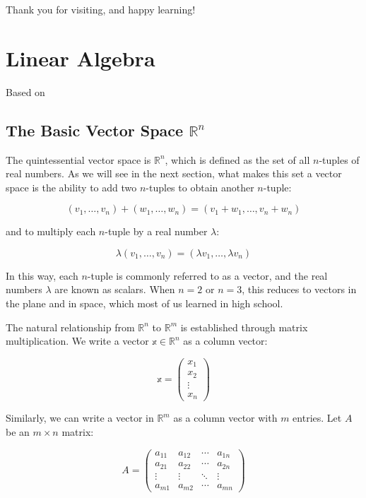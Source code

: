 \documentclass[
]{book}
\theoremstyle{definition}
\theoremstyle{definition}
\theoremstyle{definition}
\theoremstyle{definition}
\theoremstyle{remark}
\begin{document}
Thank you for visiting, and happy learning!

\hypertarget{linear-algebra}{%
\chapter{Linear Algebra}\label{linear-algebra}}

Based on \citet{garrity_2007}

\hypertarget{the-basic-vector-space-mathbbrn}{%
\section{\texorpdfstring{The Basic Vector Space \(\mathbb{R}^n\)}{The Basic Vector Space \textbackslash mathbb\{R\}\^{}n}}\label{the-basic-vector-space-mathbbrn}}

The quintessential vector space is \(\mathbb{R}^n\), which is defined as the set of all \(n\)-tuples of real numbers. As we will see in the next section, what makes this set a vector space is the ability to add two \(n\)-tuples to obtain another \(n\)-tuple:

\[
(v_1, \ldots, v_n) + (w_1, \ldots, w_n) = (v_1 + w_1, \ldots, v_n + w_n)
\]

and to multiply each \(n\)-tuple by a real number \(\lambda\):

\[
\lambda (v_1, \ldots, v_n) = (\lambda v_1, \ldots, \lambda v_n)
\]

In this way, each \(n\)-tuple is commonly referred to as a vector, and the real numbers \(\lambda\) are known as scalars. When \(n = 2\) or \(n = 3\), this reduces to vectors in the plane and in space, which most of us learned in high school.

The natural relationship from \(\mathbb{R}^n\) to \(\mathbb{R}^m\) is established through matrix multiplication. We write a vector \(\mathbb{x} \in \mathbb{R}^n\) as a column vector:

\[
\mathbb{x} = \begin{pmatrix} x_1 \\ x_2 \\ \vdots \\ x_n \end{pmatrix}
\]

Similarly, we can write a vector in \(\mathbb{R}^m\) as a column vector with \(m\) entries. Let \(A\) be an \(m \times n\) matrix:

\[
A = \begin{pmatrix}
a_{11} & a_{12} & \cdots & a_{1n} \\
a_{21} & a_{22} & \cdots & a_{2n} \\
\vdots & \vdots & \ddots & \vdots \\
a_{m1} & a_{m2} & \cdots & a_{mn}
\end{pmatrix}
\]
\end{document}
